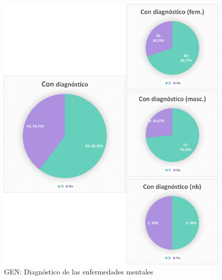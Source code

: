 \documentclass[12pt, a4paper,twoside,titlepage]{book}
\begin{document}
\begin{figure}
    \centering
    \includegraphics[width=1\linewidth]{ANEXO Gen/22AnexGENDiag}
    \caption{GEN: Diagnóstico de las enfermedades mentales}
    \label{fig:GENDiag}
\end{figure}
\end{document}
